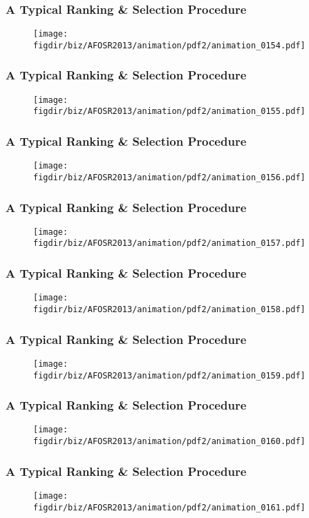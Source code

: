 \documentclass[13pt]{beamer}
\newcommand{\figdir}{../../fig}
\begin{document}
{\begin{frame}\frametitle{A Typical Ranking \& Selection Procedure}\begin{figure}\texttt{[image: \\figdir/biz/AFOSR2013/animation/pdf2/animation\_0154.pdf]}\end{figure}\end{frame}
\begin{frame}\frametitle{A Typical Ranking \& Selection Procedure}\begin{figure}\texttt{[image: \\figdir/biz/AFOSR2013/animation/pdf2/animation\_0155.pdf]}\end{figure}\end{frame}
\begin{frame}\frametitle{A Typical Ranking \& Selection Procedure}\begin{figure}\texttt{[image: \\figdir/biz/AFOSR2013/animation/pdf2/animation\_0156.pdf]}\end{figure}\end{frame}
\begin{frame}\frametitle{A Typical Ranking \& Selection Procedure}\begin{figure}\texttt{[image: \\figdir/biz/AFOSR2013/animation/pdf2/animation\_0157.pdf]}\end{figure}\end{frame}
\begin{frame}\frametitle{A Typical Ranking \& Selection Procedure}\begin{figure}\texttt{[image: \\figdir/biz/AFOSR2013/animation/pdf2/animation\_0158.pdf]}\end{figure}\end{frame}
\begin{frame}\frametitle{A Typical Ranking \& Selection Procedure}\begin{figure}\texttt{[image: \\figdir/biz/AFOSR2013/animation/pdf2/animation\_0159.pdf]}\end{figure}\end{frame}
\begin{frame}\frametitle{A Typical Ranking \& Selection Procedure}\begin{figure}\texttt{[image: \\figdir/biz/AFOSR2013/animation/pdf2/animation\_0160.pdf]}\end{figure}\end{frame}
\begin{frame}\frametitle{A Typical Ranking \& Selection Procedure}\begin{figure}\texttt{[image: \\figdir/biz/AFOSR2013/animation/pdf2/animation\_0161.pdf]}\end{figure}\end{frame}
}
\end{document}
